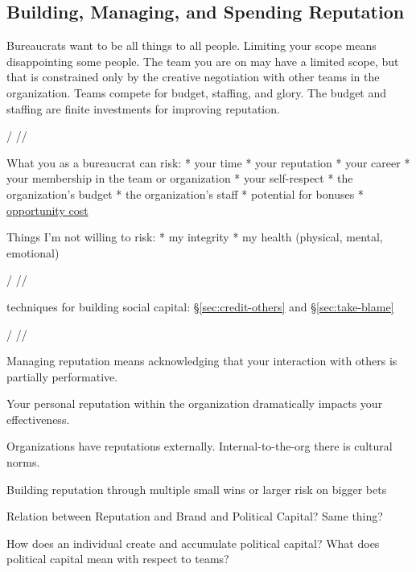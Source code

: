 \subsection{Building, Managing, and Spending Reputation\label{sec:reputation}}

Bureaucrats want to be all things to all people. Limiting your scope means disappointing some people. The team you are on may have a limited scope, but that is constrained only by the creative negotiation with other teams in the organization. Teams compete for budget, staffing, and glory. The budget and staffing are finite investments for improving reputation. 

/ //

What you as a bureaucrat can risk:
* your time
* your reputation
* your career
* your membership in the team or organization
* your self-respect
* the organization's budget
* the organization's staff
* potential for bonuses
* \href{https://en.wikipedia.org/wiki/Opportunity_cost}{opportunity cost}

Things I'm not willing to risk:
* my integrity
* my health (physical, mental, emotional)

/ //

techniques for building social capital: \S\ref{sec:credit-others} and \S\ref{sec:take-blame}

/ //

Managing reputation means acknowledging that your interaction with others is partially performative.

Your personal reputation within the organization dramatically impacts your effectiveness.

Organizations have reputations externally. 
Internal-to-the-org there is cultural norms. 




Building reputation through multiple small wins or larger risk on bigger bets


Relation between Reputation and Brand and Political Capital? Same thing?


How does an individual create and accumulate political capital? What does political capital mean with respect to teams?

